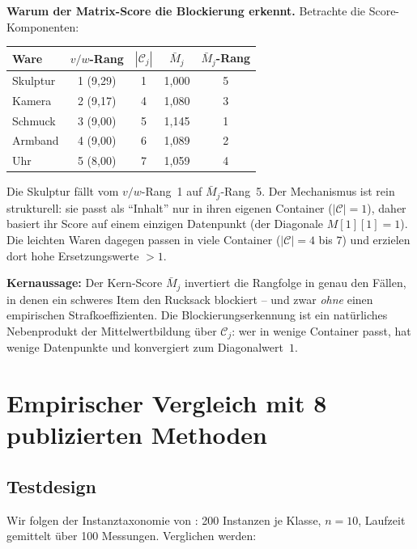 \documentclass[a4paper,11pt]{article}
\begin{document}
\medskip
\noindent
\textbf{Warum der Matrix-Score die Blockierung erkennt.}
Betrachte die Score-Komponenten:

\begin{center}
\small
\renewcommand{\arraystretch}{1.15}
\begin{tabular}{lcccc}
\toprule
Ware & $v/w$-Rang & $|\mathcal{C}_j|$ & $\bar{M}_j$
  & $\bar{M}_j$-Rang \\
\midrule
\rowcolor{redlight}
Skulptur & 1 (9{,}29) & 1 & 1{,}000 & 5 \\
Kamera   & 2 (9{,}17) & 4 & 1{,}080 & 3 \\
Schmuck  & 3 (9{,}00) & 5 & 1{,}145 & 1 \\
Armband  & 4 (9{,}00) & 6 & 1{,}089 & 2 \\
\rowcolor{teallight}
Uhr      & 5 (8{,}00) & 7 & 1{,}059 & 4 \\
\bottomrule
\end{tabular}
\end{center}

\noindent
Die Skulptur fällt vom $v/w$-Rang~1 auf $\bar{M}_j$-Rang~5.
Der Mechanismus ist rein strukturell: sie passt als ``Inhalt''
nur in ihren eigenen Container ($|\mathcal{C}| = 1$),
daher basiert ihr Score auf einem einzigen Datenpunkt
(der Diagonale $M[1][1]=1$). Die leichten Waren dagegen
passen in viele Container ($|\mathcal{C}| = 4$ bis $7$)
und erzielen dort hohe Ersetzungswerte $> 1$.

\medskip
\noindent
\textbf{Kernaussage:}
Der Kern-Score $\bar{M}_j$ invertiert die Rangfolge in genau den
Fällen, in denen ein schweres Item den Rucksack blockiert --
und zwar \emph{ohne} einen empirischen Strafkoeffizienten.
Die Blockierungserkennung ist ein natürliches Nebenprodukt
der Mittelwertbildung über $\mathcal{C}_j$: wer in wenige
Container passt, hat wenige Datenpunkte und konvergiert
zum Diagonalwert~$1$.

\section{Empirischer Vergleich mit 8 publizierten Methoden}

\subsection{Testdesign}

Wir folgen der Instanztaxonomie von \citet{pisinger2005}:
200 Instanzen je Klasse, $n=10$, Laufzeit gemittelt über
100 Messungen. Verglichen werden:
\end{document}
